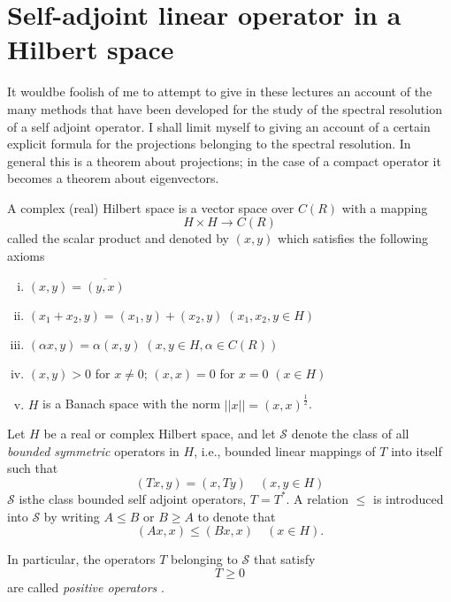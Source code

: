 \chapter{Self-adjoint linear operator in a Hilbert space}

It would\pageoriginale be foolish of me to attempt to give in these
lectures an 
account of the many methods that have been developed for the study of
the spectral resolution of a self adjoint operator. I shall limit
myself to giving an account of a certain explicit formula for  the
projections belonging to the spectral resolution. In general this is a
theorem about projections; in the case of a compact operator it
becomes a theorem about eigenvectors. 

\begin{Definition}\label{chap6:def6.1}%
  A complex (real) Hilbert space is a vector space over $C(R)$ with a mapping
  $$
  H \times H \to C (R)
  $$
  called the scalar product and denoted by $(x,y)$ which satisfies the
  following axioms 
  \begin{enumerate}[i)]
  \item $(x,y) = \overline{(y,x)}$

  \item $(x_1 + x_2,y) = (x_1,y) + (x_2,y) \; (x_1,x_2, y \in H)$

  \item $(\alpha x,y) = \alpha (x,y)\; (x,y \in H, \alpha
    \in C ( R))$

  \item $(x,y) > 0 $ for $x \neq 0$; $(x,x) =0$ for $x=0$ \; $(x \in H)$ 

  \item $H$ is a Banach space with the norm $||x|| = (x,x)^{\frac{1}{2}}$.
  \end{enumerate}
\end{Definition}

Let $H$ be a real or complex Hilbert space, and let $\mathscr{S}$
denote the class of all \textit{ bounded symmetric} operators in
$H$, i.e., bounded linear mappings of $T$ into itself such that  
$$
(Tx,y) = (x,Ty) \quad (x,y \in H)
$$ 
$\mathscr{S}$ is\pageoriginale the class bounded self adjoint
operators, $T =T^*$. A 
relation $\le$ is introduced into $\mathscr{S}$ by writing $A \le B$
or $B \ge A$ to denote that  
$$
(Ax,x) \le (Bx,x) \quad (x \in H).
$$

In particular, the operators $T$ belonging to $\mathscr{S}$ that satisfy
$$
T \ge 0
$$
are called \textit{ positive operators }.

